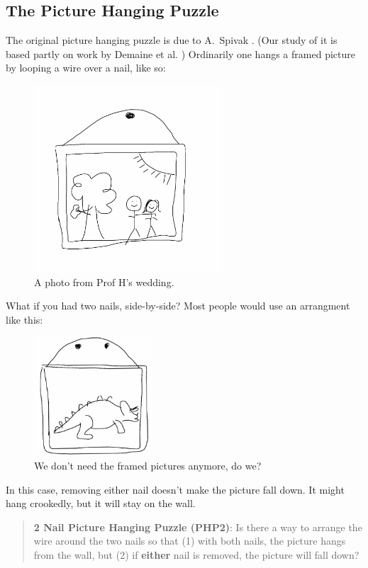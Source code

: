 \documentclass[12pt,letterpaper]{article}
\theoremstyle{definition}
\begin{document}
\subsection*{The Picture Hanging Puzzle}
The original picture hanging puzzle is due to A.~Spivak \cite{Spivak}.
(Our study of it is based partly on work by Demaine et al. \cite{Demaine})
Ordinarily one hangs a framed picture by looping a wire over a nail, like so:
\begin{figure}[h]
    \centering
    \includegraphics[height=2.75in]{rgp01pics/wedding.png}
    \caption{A photo from Prof H's wedding.}
\end{figure}
 
\clearpage
 
What if you had two nails, side-by-side? 
Most people would use an arrangment like this:
\begin{figure}[ht]
    \centering
    \includegraphics[height=1.75in]{rgp01pics/dinosaur}
    \caption{We don't need the framed pictures anymore, do we?}
\end{figure}

In this case, removing either nail doesn't make the picture fall down. 
It might hang crookedly, but it will stay on the wall.

\begin{quotation}
\textbf{2 Nail Picture Hanging Puzzle (PHP2)}:
Is there a way to arrange the wire around the two nails so that (1) with both nails, the picture hangs from the wall, but (2) if \textbf{either} nail is removed, the picture will fall down?
\end{quotation}
\end{document}
